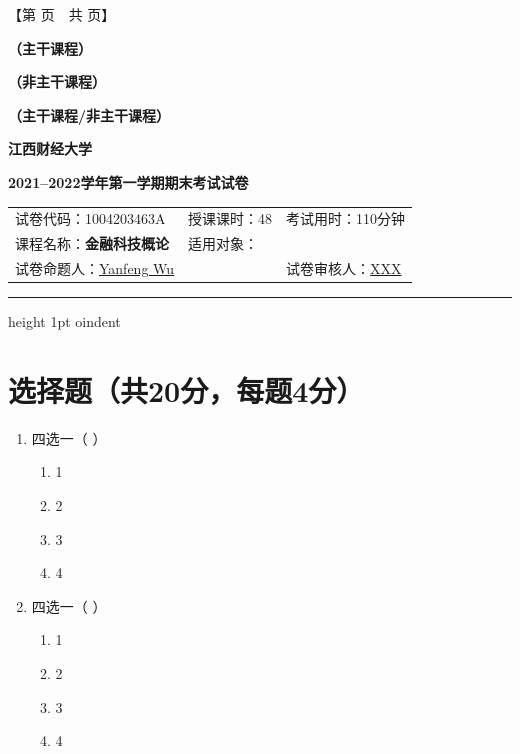 \documentclass[fontset=fandol]{ctexart}
\begin{document}
\begin{center}
    【第 \thepage 页~~共 \pageref{LastPage} 页】
\end{center}

\begin{center}
\textbf{（主干课程）}

\textbf{（非主干课程）}

\textbf{（主干课程/非主干课程）}
\end{center}
\vspace{1em}
\begin{center}
\textbf{\LARGE 江西财经大学}\par
\vspace{8pt}
\textbf{\LARGE 2021--2022学年第一学期期末考试试卷}
\end{center}

\begin{center}
\begin{tabular}{m{} m{} m{}}
     试卷代码：1004203463A &授课课时：48 &考试用时：110分钟 \\
     课程名称：\textbf{金融科技概论} 
     & \multicolumn{2}{l}{适用对象：}\\
     试卷命题人：\underline{Yanfeng Wu} &           &试卷审核人：\underline{XXX}
\end{tabular}
\end{center}
\hrule height 1pt
%
oindent

\section{选择题（共20分，每题4分）}
\begin{enumerate}
    \item 四选一（ ）
    \begin{enumerate}
        \item 1
        \item 2
        \item 3
        \item 4
    \end{enumerate}
    
    \item 四选一（ ）
    \begin{enumerate}
        \item 1
        \item 2
        \item 3
        \item 4
    \end{enumerate}
\end{enumerate}
\end{document}
